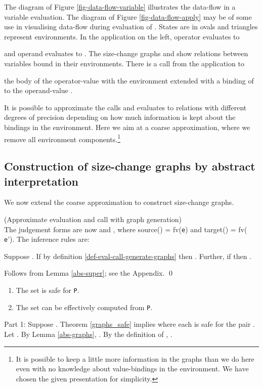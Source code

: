 \documentclass{LMCS}
\newcommand{\fl}{\noindent}
\newcommand{\be}{\begin{enumerate}}
\newcommand{\ee}{\end{enumerate}}
\newcommand{\bdfn}{\begin{defi}}
\newcommand{\edfn}{\end{defi}}
\newcommand{\blem}{\begin{lem}}
\newcommand{\elem}{\end{lem}}
\newcommand{\bprf}{\proof}
\newcommand{\eprf}{\qed}
\newcommand{\bthm}{\begin{thm}}
\newcommand{\ethm}{\end{thm}}
\theoremstyle{definition}\newtheorem{env}[thm]{Environment}
\begin{document}
\fl The diagram of Figure \ref{fig-data-flow-variable} illustrates the data-flow in a variable evaluation.    
The diagram of Figure \ref{fig-data-flow-apply} may be of some use in 
visualising data-flow during evaluation of .
States are in ovals and triangles represent environments.
In the application  on 
the left, operator  evaluates to 
 
and operand  evaluates to . 
The size-change graphs  and  show relations between variables 
bound in their environments. There is a call from the application 
 to 
 
the body of the operator-value with the environment extended with a binding of 
 to the operand-value .

It is possible to approximate the calls and evaluates to relations with different degrees of precision depending on how much information is kept about the bindings in the environment. Here we aim at a coarse approximation, where we remove all environment components.\footnote{It is possible to keep a little more information in the graphs than we do here even with no knowledge about value-bindings in the environment. 
We have chosen the given presentation for simplicity.}


\subsection{Construction of size-change graphs by abstract 
interpretation} 
\label{sec-absint-generate-graphs}


We now extend the coarse approximation to construct size-change 
graphs.

\bdfn\label{def-approx-eval-and-graph-gen} {\rm (Approximate
evaluation and call with graph generation)} \\ The judgement forms are
now  and , where
source() = fv({\tt e}) and target() = fv({\tt
e}'). The inference rules are:




\smallskip


\smallskip


\edfn
\smallskip

\blem \label{abs-graphs}Suppose . 
If   by definition \ref{def-eval-call-generate-graphs}
then . Further, if
 then 
.
\elem

\bprf  Follows from Lemma \ref{abs-super}; see the Appendix.
\eprf

\bdfn 


\edfn


\bthm \hfill
\be[\em(1)]
\item The set  is safe for {\tt P}.
\item The set   can be effectively computed 
from {\tt P}.
\ee
\ethm
\bprf 
Part 1: Suppose . Theorem 
\ref{graphs_safe} implies
 where each  is safe for the pair . 
Let . By Lemma \ref{abs-graphs},
.  
By the definition of ,  .
\end{document}
